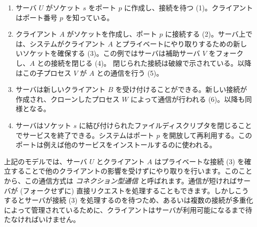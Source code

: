 \begin{enumerate}
\item
  サーバ $U$ がソケット $s$ をポート $p$ に作成し、接続を待つ (1)。クライアントはポート番号 $p$ を知っている。
%
\item
  クライアント $A$ がソケットを作成し、ポート $p$ に接続する (2)。サーバ上では、システムがクライアント $A$ とプライベートにやり取りするための新しいソケットを確保する (3)。この例ではサーバは補助サーバ $V$ をフォークし、$A$ との接続を閉じる (4)。 閉じられた接続は破線で示されている。以降はこの子プロセス $V$ が $A$ との通信を行う (5)。
%
\item
  サーバは新しいクライアント $B$ を受け付けることができる。新しい接続が作成され、クローンしたプロセス $W$ によって通信が行われる (6)。以降も同様となる。
%
\item
  サーバはソケット $s$ に結び付けられたファイルディスクリプタを閉じることでサービスを終了できる。システムはポート $p$ を開放して再利用する。このポートは例えば他のサービスをインストールするのに使われる。

\end{enumerate}

上記のモデルでは、サーバ $U$ とクライアント $A$ はプライベートな接続 (3) を確立することで他のクライアントの影響を受けずにやり取りを行います。このことから、この通信方式は \emph{コネクション型通信} と呼ばれます。通信が短ければサーバが (フォークせずに) 直接リクエストを処理することもできます。しかしこうするとサーバが接続 (3) を処理するのを待つため、あるいは複数の接続が多重化によって管理されているために、クライアントはサーバが利用可能になるまで待たなければいけません。

